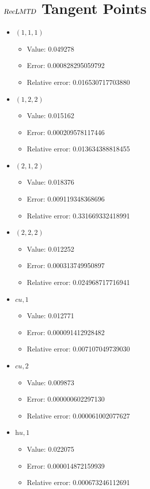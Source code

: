 \documentclass{article}%
\begin{document}
\section{$\textsl{RecLMTD}$ Tangent Points}%
\thispagestyle{plain}%
\begin{itemize}%
	\item $(1, 1, 1)$%
	\begin{itemize}%
		\item Value: 0.049278%
		\item Error: 0.000828295059792%
		\item Relative error: 0.016530717703880%
	\end{itemize}%
	\item $(1, 2, 2)$%
	\begin{itemize}%
		\item Value: 0.015162%
		\item Error: 0.000209578117446%
		\item Relative error: 0.013634388818455%
	\end{itemize}%
	\item $(2, 1, 2)$%
	\begin{itemize}%
		\item Value: 0.018376%
		\item Error: 0.009119348368696%
		\item Relative error: 0.331669332418991%
	\end{itemize}%
	\item $(2, 2, 2)$%
	\begin{itemize}%
		\item Value: 0.012252%
		\item Error: 0.000313749950897%
		\item Relative error: 0.024968717716941%
	\end{itemize}%
	\item $\textit{cu},1$%
	\begin{itemize}%
		\item Value: 0.012771%
		\item Error: 0.000091412928482%
		\item Relative error: 0.007107049739030%
	\end{itemize}%
	\item $\textit{cu},2$%
	\begin{itemize}%
		\item Value: 0.009873%
		\item Error: 0.000000602297130%
		\item Relative error: 0.000061002077627%
	\end{itemize}%
	\item $\textit{hu},1$%
	\begin{itemize}%
		\item Value: 0.022075%
		\item Error: 0.000014872159939%
		\item Relative error: 0.000673246112691%
	\end{itemize}%
\end{itemize}%
\end{document}

